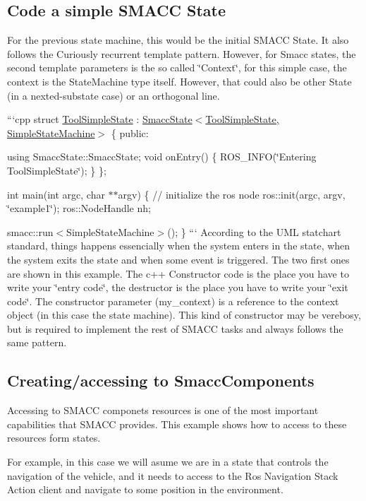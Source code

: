\subsection*{Code a simple S\-M\-A\-C\-C State}

For the previous state machine, this would be the initial S\-M\-A\-C\-C State. It also follows the Curiously recurrent template pattern. However, for Smacc states, the second template parameters is the so called \char`\"{}\-Context\char`\"{}, for this simple case, the context is the State\-Machine type itself. However, that could also be other State (in a nexted-\/substate case) or an orthogonal line.

```cpp struct \hyperlink{structToolSimpleState}{Tool\-Simple\-State} \-: \hyperlink{classsmacc_1_1SmaccState}{Smacc\-State$<$\-Tool\-Simple\-State, Simple\-State\-Machine$>$} \{ public\-:

using Smacc\-State\-::\-Smacc\-State; void on\-Entry() \{ R\-O\-S\-\_\-\-I\-N\-F\-O(\char`\"{}\-Entering Tool\-Simple\-State\char`\"{}); \} \};

int main(int argc, char $\ast$$\ast$argv) \{ // initialize the ros node ros\-::init(argc, argv, \char`\"{}example1\char`\"{}); ros\-::\-Node\-Handle nh;

smacc\-::run$<$\-Simple\-State\-Machine$>$(); \} ``` According to the U\-M\-L statchart standard, things happens essencially when the system enters in the state, when the system exits the state and when some event is triggered. The two first ones are shown in this example. The c++ Constructor code is the place you have to write your \char`\"{}entry code\char`\"{}, the destructor is the place you have to write your \char`\"{}exit code\char`\"{}. The constructor parameter (my\-\_\-context) is a reference to the context object (in this case the state machine). This kind of constructor may be verebosy, but is required to implement the rest of S\-M\-A\-C\-C tasks and always follows the same pattern.

\subsection*{Creating/accessing to Smacc\-Components}

Accessing to S\-M\-A\-C\-C componets resources is one of the most important capabilities that S\-M\-A\-C\-C provides. This example shows how to access to these resources form states.

For example, in this case we will asume we are in a state that controls the navigation of the vehicle, and it needs to access to the Ros Navigation Stack Action client and navigate to some position in the environment.

